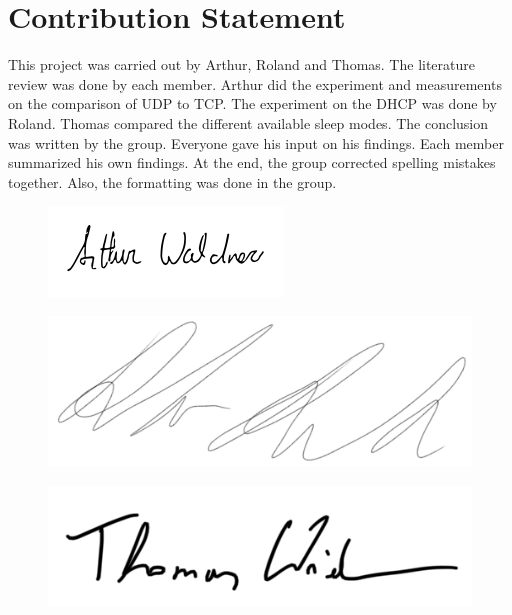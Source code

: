 \chapter*{Contribution Statement}
This project was carried out by Arthur, Roland and Thomas. The literature review was done by each member.
Arthur did the experiment and measurements on the comparison of UDP to TCP.
The experiment on the DHCP was done by Roland.
Thomas compared the different available sleep modes.
The conclusion was written by the group. Everyone gave his input on his findings.
Each member summarized his own findings. At the end, the group corrected spelling mistakes together. Also, the formatting was done in the group.

\vspace{1cm}

\begin{center}
\begin{minipage}[t]{0.3\textwidth}
    \begin{figure}[H]
        \includegraphics[width = 0.8 \linewidth]{./sign_arthur.png}
    \end{figure}
\end{minipage}
\begin{minipage}[t]{0.3\textwidth}
    \begin{figure}[H]
        \includegraphics[width = 0.8 \linewidth]{./sign_roland.png}
    \end{figure} 
\end{minipage}
\begin{minipage}[t]{0.3\textwidth}
    \begin{figure}[H]
        \includegraphics[width = 0.8 \linewidth]{./sign_thomas.png}
    \end{figure}
\end{minipage}


\end{center}
